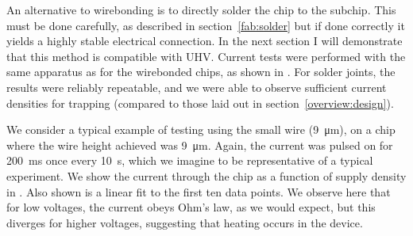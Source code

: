An alternative to wirebonding is to directly solder the chip to the subchip.
This must be done carefully, as described in section~\ref{fab:solder} but if
done correctly it yields a highly stable electrical connection. In the next
section I will demonstrate that this method is compatible with UHV. Current
tests were performed with the same apparatus as for the wirebonded chips, as
shown in . For solder joints, the results were
reliably repeatable, and we were able to observe sufficient current densities
for trapping (compared to those laid out in section~\ref{overview:design}).

We consider a typical example of testing using the small wire
(\SI{9}{\micro\meter}), on a chip where the wire height achieved was
\SI{9}{\micro\meter}. Again, the current was pulsed on for
\SI{200}{\milli\second} once every \SI{10}{\second}, which we imagine to be
representative of a typical experiment. We show the current through the chip as
a function of supply density in . Also shown
is a linear fit to the first ten data points. We observe here that for low
voltages, the current obeys Ohm's law, as we would expect, but this diverges
for higher voltages, suggesting that heating occurs in the device.

